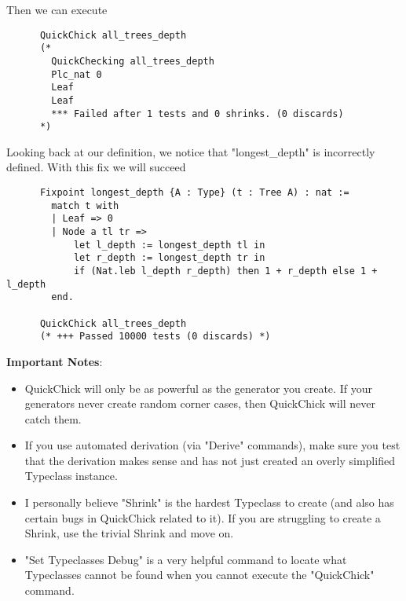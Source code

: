 \documentclass{article}
\begin{document}
    Then we can execute 
    \begin{verbatim}
      QuickChick all_trees_depth
      (*
        QuickChecking all_trees_depth
        Plc_nat 0
        Leaf
        Leaf
        *** Failed after 1 tests and 0 shrinks. (0 discards)
      *)
    \end{verbatim}
    Looking back at our definition, we notice that "longest\_depth" is incorrectly defined. With this fix we will succeed
    \begin{verbatim}
      Fixpoint longest_depth {A : Type} (t : Tree A) : nat :=
        match t with
        | Leaf => 0
        | Node a tl tr => 
            let l_depth := longest_depth tl in
            let r_depth := longest_depth tr in
            if (Nat.leb l_depth r_depth) then 1 + r_depth else 1 + l_depth
        end.

      QuickChick all_trees_depth
      (* +++ Passed 10000 tests (0 discards) *)
    \end{verbatim}
    \textbf{Important Notes}:
    \begin{itemize}
      \item QuickChick will only be as powerful as the generator you create. If your generators never create random corner cases, then QuickChick will never catch them.
      \item If you use automated derivation (via "Derive" commands), make sure you test that the derivation makes sense and has not just created an overly simplified Typeclass instance.
      \item I personally believe "Shrink" is the hardest Typeclass to create (and also has certain bugs in QuickChick related to it). If you are struggling to create a Shrink, use the trivial Shrink and move on.
      \item "Set Typeclasses Debug" is a very helpful command to locate what Typeclasses cannot be found when you cannot execute the "QuickChick" command.
    \end{itemize}
\end{document}
